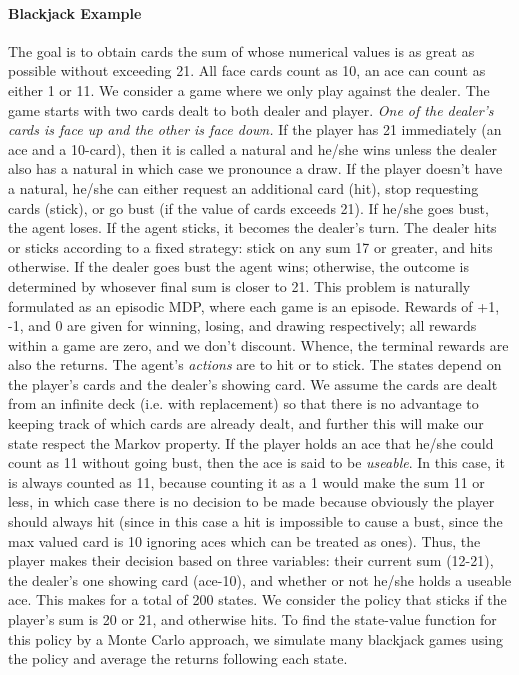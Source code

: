 \documentclass[12pt]{article}
\begin{document}
\paragraph{Blackjack Example} The goal is to obtain cards the sum of whose numerical values is as great as possible without exceeding 21. All face cards count as 10, an ace can count as either 1 or 11. We consider a game where we only play against the dealer. The game starts with two cards dealt to both dealer and player. \emph{One of the dealer's cards is face up and the other is face down.} If the player has 21 immediately (an ace and a 10-card), then it is called a natural and he/she wins unless the dealer also has a natural in which case we pronounce a draw. If the player doesn't have a natural, he/she can either request an additional card (hit), stop requesting cards (stick), or go bust (if the value of cards exceeds 21). If he/she goes bust, the agent loses. If the agent sticks, it becomes the dealer's turn. The dealer hits or sticks according to a fixed strategy: stick on any sum 17 or greater, and hits otherwise. If the dealer goes bust the agent wins; otherwise, the outcome is determined by whosever final sum is closer to 21. This problem is naturally formulated as an episodic MDP, where each game is an episode. Rewards of +1, -1, and 0 are given for winning, losing, and drawing respectively; all rewards within a game are zero, and we don't discount. Whence, the terminal rewards are also the returns. The agent's \emph{actions} are to hit or to stick. The states depend on the player's cards and the dealer's showing card. We assume the cards are dealt from an infinite deck (i.e. with replacement) so that there is no advantage to keeping track of which cards are already dealt, and further this will make our state respect the Markov property. If the player holds an ace that he/she could count as 11 without going bust, then the ace is said to be \emph{useable}. In this case, it is always counted as 11, because counting it as a 1 would make the sum 11 or less, in which case there is no decision to be made because obviously the player should always hit (since in this case a hit is impossible to cause a bust, since the max valued card is 10 ignoring aces which can be treated as ones). Thus, the player makes their decision based on three variables: their current sum (12-21), the dealer's one showing card (ace-10), and whether or not he/she holds a useable ace. This makes for a total of 200 states. We consider the policy that sticks if the player's sum is 20 or 21, and otherwise hits. To find the state-value function for this policy by a Monte Carlo approach, we simulate many blackjack games using the policy and average the returns following each state.
\end{document}
